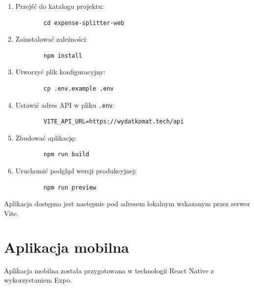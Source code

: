 \begin{enumerate}
	\item Przejść do katalogu projektu:
	\begin{verbatim}
		cd expense-splitter-web
	\end{verbatim}
	\item Zainstalować zależności:
	\begin{verbatim}
		npm install
	\end{verbatim}
	\item Utworzyć plik konfiguracyjny:
	\begin{verbatim}
		cp .env.example .env
	\end{verbatim}
	\item Ustawić adres API w pliku \verb|.env|:
	\begin{verbatim}
		VITE_API_URL=https://wydatkomat.tech/api
	\end{verbatim}
	\item Zbudować aplikację:
	\begin{verbatim}
		npm run build
	\end{verbatim}
	\item Uruchomić podgląd wersji produkcyjnej:
	\begin{verbatim}
		npm run preview
	\end{verbatim}
\end{enumerate}

Aplikacja dostępna jest następnie pod adresem lokalnym wskazanym przez serwer Vite.

\section{Aplikacja mobilna}

Aplikacja mobilna została przygotowana w technologii React Native z wykorzystaniem Expo.


